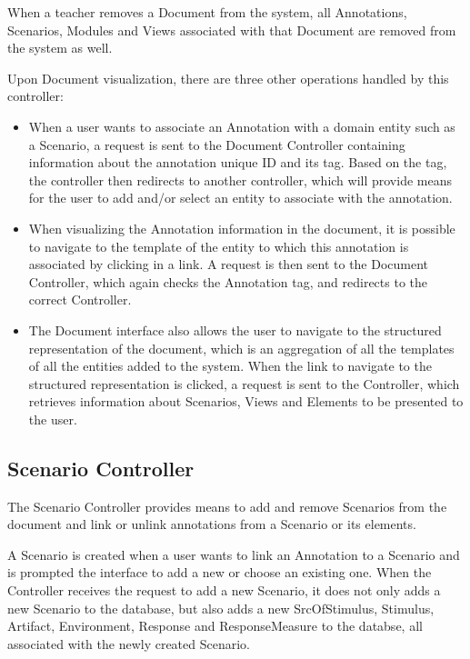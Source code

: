 When a teacher removes a Document from the system, all Annotations, Scenarios, Modules and Views associated with that Document are removed from the system as well.

Upon Document visualization, there are three other operations handled by this controller:
\begin{itemize}
\item When a user wants to associate an Annotation with a domain entity such as a Scenario, a request is sent to the Document Controller containing information about the annotation unique ID and its tag. Based on the tag, the controller then redirects to another controller, which will provide means for the user to add and/or select an entity to associate with the annotation.

\item When visualizing the Annotation information in the document, it is possible to navigate to the template of the entity to which this annotation is associated by clicking in a link. A request is then sent to the Document Controller, which again checks the Annotation tag, and redirects to the correct Controller.

\item The Document interface also allows the user to navigate to the structured representation of the document, which is an aggregation of all the templates of all the entities added to the system. When the link to navigate to the structured representation is clicked, a request is sent to the Controller, which retrieves information about Scenarios, Views and Elements to be presented to the user.  
\end{itemize}

 
\subsection{Scenario Controller}

The Scenario Controller provides means to add and remove Scenarios from the document and link or unlink annotations from a Scenario or its elements.

A Scenario is created when a user wants to link an Annotation to a Scenario and is prompted the interface to add a new or choose an existing one. When the Controller receives the request to add a new Scenario, it does not only adds a new Scenario to the database, but also adds a new SrcOfStimulus, Stimulus, Artifact, Environment, Response and ResponseMeasure to the databse, all associated with the newly created Scenario. 

